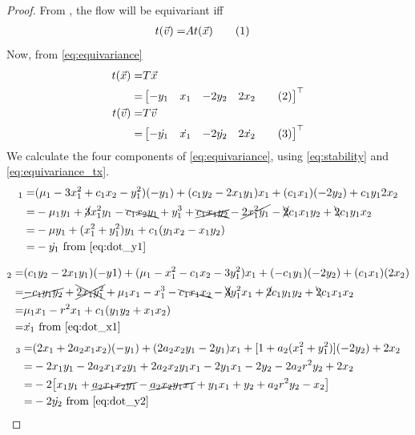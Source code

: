 \documentclass[]{article}
\newcommand\numberthis{\addtocounter{equation}{1}\tag{\theequation}}
\begin{document}
\begin{proof}
	From \cite[12.15]{ChaosBook}, the flow will be equivariant iff 
	\begin{align*}
		t(\vec{v}) =& At(\vec{x}) \numberthis \label{eq:equivariance}
	\end{align*}
	Now, from \eqref{eq:equivariance}
	\begin{align*}
		t(\vec{x})=&T\vec{x}\\
		 =&\begin{bmatrix}
			-y_1&x_1&-2y_2&2x_2  \numberthis \label{eq:equivariance_tx}
		\end{bmatrix}^\top\\
		t(\vec{v})=&T\vec{v}\\
		=&\begin{bmatrix}
			-\dot{y_1}&\dot{x_1}&-2\dot{y_2}&2\dot{x_2}  \numberthis \label{eq:equivariance:tv}
		\end{bmatrix}^\top
	\end{align*}
	We calculate the four components of \eqref{eq:equivariance}, using \eqref{eq:stability} and \eqref{eq:equivariance_tx}.
	\begin{align*}
		[A(\vec{x}) t(\vec{x})]_1 =& 
		(\mu_1-3x_1^2+c_1x_2-y_1^2)(-y_1)+(c_1y_2-2x_1y_1)x_1+(c_1x_1)(-2y_2)+c_1y_12x_2\\
		=&-\mu_1 y_1 + \cancel{3} x_1^2 y_1 -\bcancel{ c_1 x_2 y_1} + y_1^3 + \xcancel{c_1 x_1 y_2} -\cancel{2 x_1^2 y_1} - \xcancel{2} c_1 x_1 y_2 + \bcancel{2} c_1y_1x_2\\
		=& -\mu y_1 + (x_1^2 + y_1^2) y_1 + c_1(y_1x_2-x_1y_2)\\
		=& -\dot{y_1} \text{ from \eqref{eq:dot_y1}}
	\end{align*}
	
	\begin{align*}
		[A(\vec{x}) t(\vec{x})]_2 =& 	(c_1y_2-2x_1y_1)(-y1)+(\mu_1-x_1^2-c_1x_2-3y_1^2)x_1+(-c_1y_1)(-2y_2)+(c_1x_1)(2x_2)\\
		=& \cancel{-c_1y_1y_2} + \xcancel{2x_1y_1^2} + \mu_1 x_1-x_1^3-\bcancel{c_1x_1x_2}-\xcancel{3}y_1^2x_1+\cancel{2} c_1y_1y_2 + \bcancel{2}c_1x_1x_2\\
		=& \mu_1 x_1 -r^2 x_1 + c_1(y_1y_2+x_1x_2)\\
		=& \dot{x_1}  \text{ from \eqref{eq:dot_x1}}
	\end{align*}
	\begin{align*}
		[A(\vec{x}) t(\vec{x})]_3 =& (2x_1+2a_2x_1x_2)(-y_1) + (2a_2x_2y_1-2y_1) x_1 + [1+a_2(x_1^2+y_1^2)](-2y_2) + 2 x_2\\
		=& -2 x_1 y_1 -2 a_2 x_1 x_2 y_1 + 2 a_2 x_2 y_1 x_1 - 2y_1 x_1 - 2 y_2 -2 a_2 r^2 y_2 + 2x_2\\
		=& -2 \big[ x_1 y_1 + \cancel{a_2 x_1 x_2 y_1} - \cancel{a_2 x_2 y_1 x_1} + y_1 x_1 + y_2 +  a_2 r^2 y_2 - x_2\big]\\
		=& -2 \dot{y_2}  \text{ from \eqref{eq:dot_y2}}
	\end{align*}
	

\end{proof}
\end{document}
